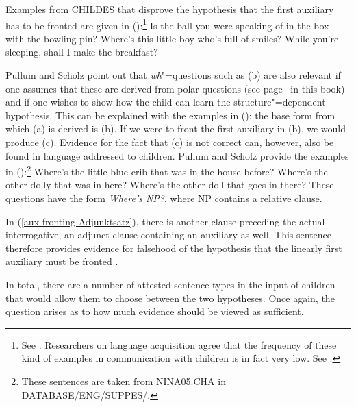 Examples from CHILDES that disprove the hypothesis that the first auxiliary has to be fronted are given in ():\footnote{ 
  See . Researchers on language acquisition agree that the frequency of these kind of examples in communication with children is in fact
  very low. See .
}
\eal
\label{aux-fronting-childes}
\ex Is the ball you were speaking of in the box with the bowling pin?
\ex Where's this little boy who's full of smiles?
\ex\label{aux-fronting-Adjunktsatz} While you're sleeping, shall I make the breakfast?
\zl

\noindent
Pullum and Scholz point out that \emph{wh}"=questions such as (b) are also relevant if one assumes that these are derived from
polar questions (see page~\pageref{Seite-GB-Entscheidungsfragen-Englisch} in this book) and if one wishes to show how the child can
learn the structure"=dependent hypothesis. This can be explained with the examples in (): the
base form from which (a) is derived is (b). If we were to front the first auxiliary in (b), we would produce (c).
\eal
{}
\zl
Evidence for the fact that (c) is not correct can, however, also be found in language addressed to children.
Pullum and Scholz provide the examples in ():\footnote{
	These sentences are taken from NINA05.CHA in DATABASE/ENG/SUPPES/.
}
\eal
\label{wh-Fragen-Hilfsverbinversion}
\ex Where's the little blue crib that was in the house before?
\ex Where's the other dolly that was in here?
\ex Where's the other doll that goes in there?
\zl
These questions have the form \emph{Where's NP?}, where NP contains a relative clause.

In (\ref{aux-fronting-Adjunktsatz}), there is another clause preceding the actual interrogative, an adjunct clause containing an
auxiliary as well. This sentence therefore provides evidence for falsehood of the hypothesis that the linearly first auxiliary must be fronted
\citep[]{Sampson89a}. 

In total, there are a number of attested sentence types in the input of children that would allow them to choose between the two
hypotheses. Once again, the question arises as to how much evidence should be viewed as sufficient.

